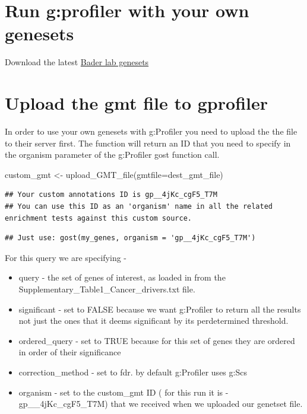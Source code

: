 \documentclass[
]{book}
\newenvironment{Shaded}{\begin{snugshade}}{\end{snugshade}}
\newcommand{\AttributeTok}[1]{\textcolor[rgb]{0.77,0.63,0.00}{#1}}
\newcommand{\FunctionTok}[1]{\textcolor[rgb]{0.00,0.00,0.00}{#1}}
\newcommand{\NormalTok}[1]{#1}
\newcommand{\OtherTok}[1]{\textcolor[rgb]{0.56,0.35,0.01}{#1}}
\providecommand{\tightlist}{%
  \setlength{\itemsep}{0pt}\setlength{\parskip}{0pt}}
\begin{document}
\hypertarget{run-gprofiler-with-your-own-genesets}{%
\section{Run g:profiler with your own genesets}\label{run-gprofiler-with-your-own-genesets}}

Download the latest \href{https://download.baderlab.org/EM_Genesets/current_release/Human/}{Bader lab genesets}

\hypertarget{upload-the-gmt-file-to-gprofiler}{%
\section{Upload the gmt file to gprofiler}\label{upload-the-gmt-file-to-gprofiler}}

In order to use your own genesets with g:Profiler you need to upload the the file to their server first. The function will return an ID that you need to specify in the organism parameter of the g:Profiler gost function call.

\begin{Shaded}
\begin{Highlighting}[]
\NormalTok{custom\_gmt }\OtherTok{\textless{}{-}} \FunctionTok{upload\_GMT\_file}\NormalTok{(}\AttributeTok{gmtfile=}\NormalTok{dest\_gmt\_file)}
\end{Highlighting}
\end{Shaded}

\begin{verbatim}
## Your custom annotations ID is gp__4jKc_cgF5_T7M
## You can use this ID as an 'organism' name in all the related enrichment tests against this custom source.
\end{verbatim}

\begin{verbatim}
## Just use: gost(my_genes, organism = 'gp__4jKc_cgF5_T7M')
\end{verbatim}

For this query we are specifying -

\begin{itemize}
\tightlist
\item
  query - the set of genes of interest, as loaded in from the Supplementary\_Table1\_Cancer\_drivers.txt file.
\item
  significant - set to FALSE because we want g:Profiler to return all the results not just the ones that it deems significant by its perdetermined threshold.
\item
  ordered\_query - set to TRUE because for this set of genes they are ordered in order of their significance
\item
  correction\_method - set to fdr. by default g:Profiler uses g:Scs
\item
  organism - set to the custom\_gmt ID ( for this run it is - gp\_\_4jKc\_cgF5\_T7M) that we received when we uploaded our genetset file.
\end{itemize}
\end{document}
